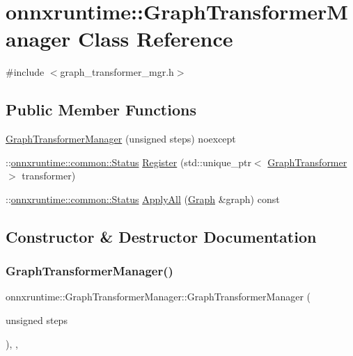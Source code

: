 \hypertarget{classonnxruntime_1_1GraphTransformerManager}{}\section{onnxruntime\+:\+:Graph\+Transformer\+Manager Class Reference}
\label{classonnxruntime_1_1GraphTransformerManager}


{\ttfamily \#include $<$graph\+\_\+transformer\+\_\+mgr.\+h$>$}

\subsection*{Public Member Functions}
\begin{DoxyCompactItemize}
\item 
\mbox{\hyperlink{classonnxruntime_1_1GraphTransformerManager_ac8738c9f141a81afce20a111d84d08f7}{Graph\+Transformer\+Manager}} (unsigned steps) noexcept
\item 
\+::\mbox{\hyperlink{classonnxruntime_1_1common_1_1Status}{onnxruntime\+::common\+::\+Status}} \mbox{\hyperlink{classonnxruntime_1_1GraphTransformerManager_add72b4fffb313a7a6433d14786f8ab1d}{Register}} (std\+::unique\+\_\+ptr$<$ \mbox{\hyperlink{classonnxruntime_1_1GraphTransformer}{Graph\+Transformer}} $>$ transformer)
\item 
\+::\mbox{\hyperlink{classonnxruntime_1_1common_1_1Status}{onnxruntime\+::common\+::\+Status}} \mbox{\hyperlink{classonnxruntime_1_1GraphTransformerManager_aaf5d2cf85d054f40d119bd45247f119d}{Apply\+All}} (\mbox{\hyperlink{classonnxruntime_1_1Graph}{Graph}} \&graph) const
\end{DoxyCompactItemize}


\subsection{Constructor \& Destructor Documentation}
\mbox{\label{classonnxruntime_1_1GraphTransformerManager_ac8738c9f141a81afce20a111d84d08f7}} 
\subsubsection{\texorpdfstring{Graph\+Transformer\+Manager()}{GraphTransformerManager()}}
{\footnotesize\ttfamily onnxruntime\+::\+Graph\+Transformer\+Manager\+::\+Graph\+Transformer\+Manager (\begin{DoxyParamCaption}\item[{unsigned}]{steps }\end{DoxyParamCaption})\hspace{0.3cm}{\ttfamily [inline]}, {\ttfamily [explicit]}, {\ttfamily [noexcept]}}



